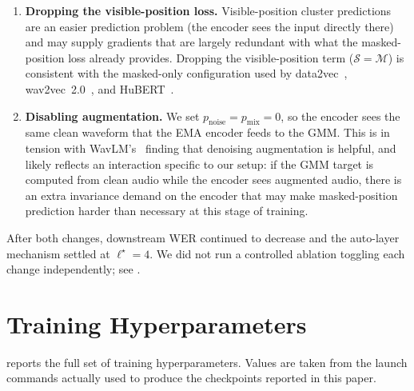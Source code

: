 \documentclass[9pt,twocolumn]{article}
\theoremstyle{plain}
\theoremstyle{definition}
\theoremstyle{remark}
\begin{document}
\begin{enumerate}
    \item \textbf{Dropping the visible-position loss.} Visible-position cluster predictions are an easier prediction problem (the encoder sees the input directly there) and may supply gradients that are largely redundant with what the masked-position loss already provides. Dropping the visible-position term ($\mathcal{S} = \mathcal{M}$) is consistent with the masked-only configuration used by data2vec~\citep{baevski2022data2vec}, wav2vec~2.0~\citep{baevski2020wav2vec}, and HuBERT~\citep{hsu2021hubert}.
    \item \textbf{Disabling augmentation.} We set $p_{\text{noise}} = p_{\text{mix}} = 0$, so the encoder sees the same clean waveform that the EMA encoder feeds to the GMM. This is in tension with WavLM's~\citep{chen2022wavlm} finding that denoising augmentation is helpful, and likely reflects an interaction specific to our setup: if the GMM target is computed from clean audio while the encoder sees augmented audio, there is an extra invariance demand on the encoder that may make masked-position prediction harder than necessary at this stage of training.
\end{enumerate}

After both changes, downstream WER continued to decrease and the auto-layer mechanism settled at $\ell^\star\!=\!4$. We did not run a controlled ablation toggling each change independently; see .

\section{Training Hyperparameters}
\label{app:hyperparams}

 reports the full set of training hyperparameters. Values are taken from the launch commands actually used to produce the checkpoints reported in this paper.
\end{document}
